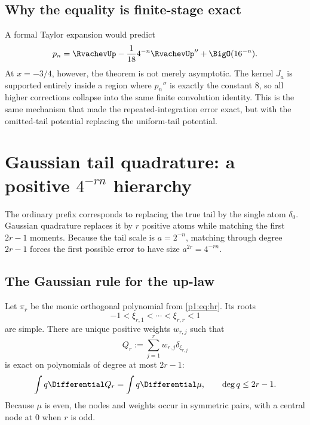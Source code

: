 \documentclass[11pt]{article}
\numberwithin{equation}{section}
\theoremstyle{definition}
\theoremstyle{remark}
\begin{document}
\subsection{Why the equality is finite-stage exact}

A formal Taylor expansion would predict
\[
 p_n=\RvachevUp-\frac1{18}4^{-n}\RvachevUp''+\BigO(16^{-n}).
\]
At $x=-3/4$, however, the theorem is not merely asymptotic.  The kernel $J_a$ is supported entirely inside a region where $p_n''$ is exactly the constant $8$, so all higher corrections collapse into the same finite convolution identity.  This is the same mechanism that made the repeated-integration error exact, but with the omitted-tail potential replacing the uniform-tail potential.

\section{Gaussian tail quadrature: a positive $4^{-rn}$ hierarchy}
\label{p1:sec:gaussian}

The ordinary prefix corresponds to replacing the true tail by the single atom $\delta_0$.  Gaussian quadrature replaces it by $r$ positive atoms while matching the first $2r-1$ moments.  Because the tail scale is $a=2^{-n}$, matching through degree $2r-1$ forces the first possible error to have size $a^{2r}=4^{-rn}$.

\subsection{The Gaussian rule for the up-law}

Let $\pi_r$ be the monic orthogonal polynomial from \eqref{p1:eq:hr}.  Its roots
\begin{equation}
 -1<\xi_{r,1}<\cdots<\xi_{r,r}<1
 \label{p1:eq:gauss-nodes}
\end{equation}
are simple.  There are unique positive weights $w_{r,j}$ such that
\begin{equation}
 Q_r:=\sum_{j=1}^{r}w_{r,j}\delta_{\xi_{r,j}}
 \label{p1:eq:Qr}
\end{equation}
is exact on polynomials of degree at most $2r-1$:
\begin{equation}
 \int q\Differential Q_r=\int q\Differential\mu,
 \qquad \deg q\le2r-1.
 \label{p1:eq:Gauss-exactness}
\end{equation}
Because $\mu$ is even, the nodes and weights occur in symmetric pairs, with a central node at $0$ when $r$ is odd.
\end{document}
